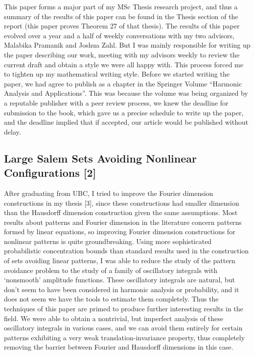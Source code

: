 \documentclass[12pt]{article}
\theoremstyle{plain}
\theoremstyle{remark}
\theoremstyle{definition}
\begin{document}
This paper forms a major part of my MSc Thesis research project, and thus a summary of the results of this paper can be found in the Thesis section of the report (this paper proves Theorem 27 of that thesis). The results of this paper evolved over a year and a half of weekly conversations with my two advisors, Malabika Pramanik and Joshua Zahl. But I was mainly responsible for writing up the paper describing our work, meeting with my advisors weekly to review the current draft and obtain a style we were all happy with. This process forced me to tighten up my mathematical writing style. Before we started writing the paper, we had agree to publish as a chapter in the Springer Volume ``Harmonic Analysis and Applications''. This was because the volume was being organized by a reputable publisher with a peer review process, we knew the deadline for submission to the book, which gave us a precise schedule to write up the paper, and the deadline implied that if accepted, our article would be published without delay.

\subsection*{Large Salem Sets Avoiding Nonlinear Configurations [2]}

After graduating from UBC, I tried to improve the Fourier dimension constructions in my thesis [3], since these constructions had smaller dimension than the Hausdorff dimension construction given the same assumptions. Most results about patterns and Fourier dimension in the literature concern patterns formed by linear equations, so improving Fourier dimension constructions for nonlinear patterns is quite groundbreaking. Using more sophisticated probabilistic concentration bounds than standard results used in the construction of sets avoiding linear patterns, I was able to reduce the study of the pattern avoidance problem to the study of a family of oscillatory integrals with `nonsmooth' amplitude functions. These oscillatory integrals are natural, but don't seem to have been considered in harmonic analysis or probability, and it does not seem we have the tools to estimate them completely. Thus the techniques of this paper are primed to produce further interesting results in the field. We were able to obtain a nontrivial, but imperfect analysis of these oscillatory integrals in various cases, and we can avoid them entirely for certain patterns exhibiting a very weak translation-invariance property, thus completely removing the barrier between Fourier and Hausdorff dimensions in this case.
\end{document}
